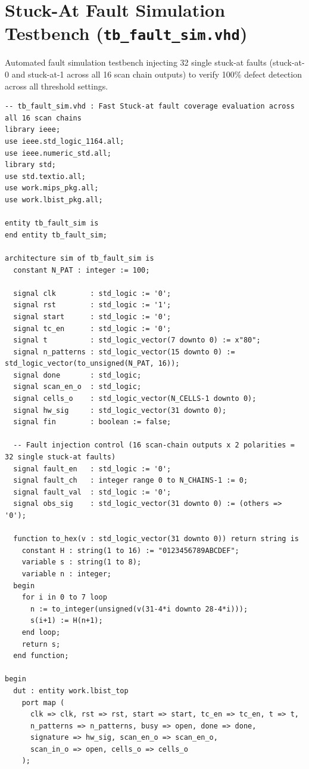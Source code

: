 \documentclass[conference]{IEEEtran}
\begin{document}
\section{Stuck-At Fault Simulation Testbench (\texttt{tb\_fault\_sim.vhd})}
\label{app:tb_fault_sim}
Automated fault simulation testbench injecting 32 single stuck-at faults (stuck-at-0 and stuck-at-1 across all 16 scan chain outputs) to verify 100\% defect detection across all threshold settings.

\begin{lstlisting}[style=vhdlstyle, caption={Stuck-At Fault Simulation Testbench (\texttt{tb\_fault\_sim.vhd})}]
-- tb_fault_sim.vhd : Fast Stuck-at fault coverage evaluation across all 16 scan chains
library ieee;
use ieee.std_logic_1164.all;
use ieee.numeric_std.all;
library std;
use std.textio.all;
use work.mips_pkg.all;
use work.lbist_pkg.all;

entity tb_fault_sim is
end entity tb_fault_sim;

architecture sim of tb_fault_sim is
  constant N_PAT : integer := 100;

  signal clk        : std_logic := '0';
  signal rst        : std_logic := '1';
  signal start      : std_logic := '0';
  signal tc_en      : std_logic := '0';
  signal t          : std_logic_vector(7 downto 0) := x"80";
  signal n_patterns : std_logic_vector(15 downto 0) := std_logic_vector(to_unsigned(N_PAT, 16));
  signal done       : std_logic;
  signal scan_en_o  : std_logic;
  signal cells_o    : std_logic_vector(N_CELLS-1 downto 0);
  signal hw_sig     : std_logic_vector(31 downto 0);
  signal fin        : boolean := false;

  -- Fault injection control (16 scan-chain outputs x 2 polarities = 32 single stuck-at faults)
  signal fault_en   : std_logic := '0';
  signal fault_ch   : integer range 0 to N_CHAINS-1 := 0;
  signal fault_val  : std_logic := '0';
  signal obs_sig    : std_logic_vector(31 downto 0) := (others => '0');

  function to_hex(v : std_logic_vector(31 downto 0)) return string is
    constant H : string(1 to 16) := "0123456789ABCDEF";
    variable s : string(1 to 8);
    variable n : integer;
  begin
    for i in 0 to 7 loop
      n := to_integer(unsigned(v(31-4*i downto 28-4*i)));
      s(i+1) := H(n+1);
    end loop;
    return s;
  end function;

begin
  dut : entity work.lbist_top
    port map (
      clk => clk, rst => rst, start => start, tc_en => tc_en, t => t,
      n_patterns => n_patterns, busy => open, done => done,
      signature => hw_sig, scan_en_o => scan_en_o,
      scan_in_o => open, cells_o => cells_o
    );


\end{lstlisting}
\end{document}
